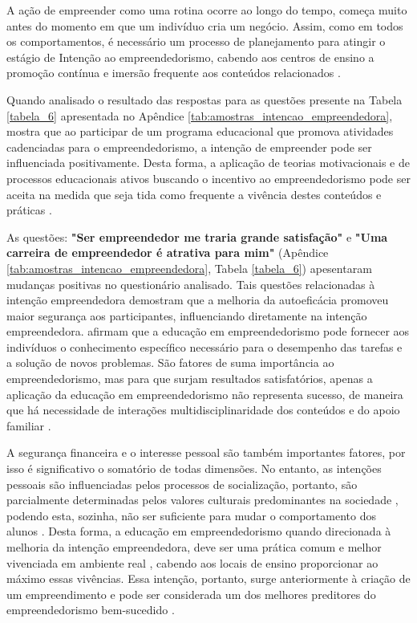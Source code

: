 A ação de empreender como uma rotina ocorre ao longo do tempo, começa muito antes do momento em que um indivíduo cria um negócio. Assim, como em todos os comportamentos, é necessário um processo de planejamento para atingir o estágio de Intenção ao empreendedorismo, cabendo aos centros de ensino a promoção contínua e imersão frequente aos conteúdos relacionados \cite{garcia-rodriguez_entrepreneurial_2017}.

Quando analisado o resultado das respostas para as questões presente na Tabela \ref{tabela_6} apresentada no Apêndice \ref{tab:amostras_intencao_empreendedora}, mostra que ao participar de um programa educacional que promova atividades cadenciadas para o empreendedorismo, a intenção de empreender pode ser influenciada positivamente. Desta forma, a aplicação de teorias motivacionais e de processos educacionais ativos buscando o incentivo ao empreendedorismo pode ser aceita na medida que seja tida como frequente a vivência destes conteúdos e práticas \cite{fayolle_beyond_2014}.

As questões: \textbf{"Ser empreendedor me traria grande satisfação"} e \textbf{"Uma carreira de empreendedor é atrativa para mim"} (Apêndice \ref{tab:amostras_intencao_empreendedora}, Tabela \ref{tabela_6}) apesentaram mudanças positivas no questionário analisado. Tais questões relacionadas à intenção empreendedora demostram que a melhoria da autoeficácia promoveu maior segurança aos participantes, influenciando diretamente na intenção empreendedora.  afirmam que a educação em empreendedorismo pode fornecer aos indivíduos o conhecimento específico necessário para o desempenho das tarefas e a solução de novos problemas. São fatores de suma importância ao empreendedorismo, mas para que surjam resultados satisfatórios, apenas a aplicação da educação em empreendedorismo não representa sucesso, de maneira que há necessidade de interações multidisciplinaridade dos conteúdos e do apoio familiar \cite{edelman_impact_2016}. 

A segurança financeira e o interesse pessoal são também importantes fatores, por isso é significativo o somatório de todas dimensões. No entanto, as intenções pessoais são influenciadas pelos processos de socialização, portanto, são parcialmente determinadas pelos valores culturais predominantes na sociedade \cite{schwartz_les_2006}, podendo esta, sozinha, não ser suficiente para mudar o comportamento dos alunos \cite{adelaja_students_2018}. Desta forma, a educação em empreendedorismo quando direcionada à melhoria da intenção empreendedora, deve ser uma prática comum e melhor vivenciada em ambiente real \cite{damanpour_phases_2006}, cabendo aos locais de ensino proporcionar ao máximo essas vivências. Essa intenção, portanto, surge anteriormente à criação de um empreendimento e pode ser considerada um dos melhores preditores do empreendedorismo bem-sucedido \cite{ajzen_attitudes_1987,krueger_competing_2000,garcia-rodriguez_entrepreneurial_2017}.

